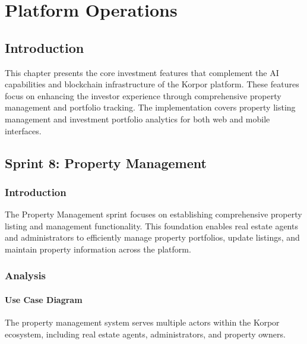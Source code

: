 \chapter{Platform Operations}


\section*{Introduction}

This chapter presents the core investment features that complement the AI capabilities and blockchain infrastructure of the Korpor platform. These features focus on enhancing the investor experience through comprehensive property management and portfolio tracking. The implementation covers property listing management and investment portfolio analytics for both web and mobile interfaces.

\section{Sprint 8: Property Management}

\subsection{Introduction}
The Property Management sprint focuses on establishing comprehensive property listing and management functionality. This foundation enables real estate agents and administrators to efficiently manage property portfolios, update listings, and maintain property information across the platform.

\subsection{Analysis}
\subsubsection{Use Case Diagram}
The property management system serves multiple actors within the Korpor ecosystem, including real estate agents, administrators, and property owners.


